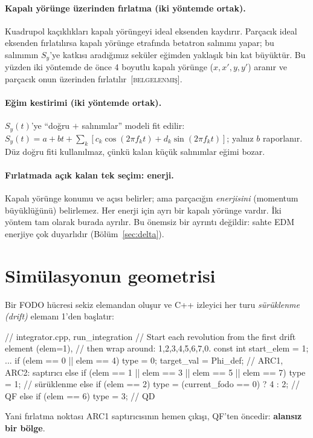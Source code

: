 \documentclass[11pt,a4paper]{article}
\newcommand{\BEL}{\textsc{[belgelenmiş]}}
\begin{document}
\paragraph{Kapalı yörünge üzerinden fırlatma (iki yöntemde ortak).} Kuadrupol kaçıklıkları kapalı
yörüngeyi ideal eksenden kaydırır. Parçacık ideal eksenden fırlatılırsa kapalı yörünge etrafında
betatron salınımı yapar; bu salınımın $S_y$'ye katkısı aradığımız seküler eğimden yaklaşık bin kat
büyüktür. Bu yüzden iki yöntemde de önce 4 boyutlu kapalı yörünge ($x,x',y,y'$) aranır ve parçacık onun
üzerinden fırlatılır~\BEL.

\paragraph{Eğim kestirimi (iki yöntemde ortak).} $S_y(t)$'ye ``doğru $+$ salınımlar'' modeli fit edilir:
$S_y(t)=a+bt+\sum_k[c_k\cos(2\pi f_kt)+d_k\sin(2\pi f_kt)]$; yalnız $b$ raporlanır. Düz doğru fiti
kullanılmaz, çünkü kalan küçük salınımlar eğimi bozar.

\paragraph{Fırlatmada açık kalan tek seçim: enerji.} Kapalı yörünge konumu ve açısı belirler; ama
parçacığın \emph{enerjisini} (momentum büyüklüğünü) belirlemez. Her enerji için ayrı bir kapalı yörünge
vardır. İki yöntem tam olarak burada ayrılır. Bu önemsiz bir ayrıntı değildir: sahte EDM enerjiye çok
duyarlıdır (Bölüm~\ref{sec:delta}).

\section{Simülasyonun geometrisi}

Bir FODO hücresi sekiz elemandan oluşur ve C++ izleyici her turu \emph{sürüklenme (drift)} elemanı 1'den
başlatır:
\begin{kodblok}
// integrator.cpp, run_integration
// Start each revolution from the first drift element (elem=1),
// then wrap around: 1,2,3,4,5,6,7,0.
const int start_elem = 1;
...
if (elem == 0 || elem == 4) { type = 0; target_val = Phi_def; }        // ARC1, ARC2: saptırıcı
else if (elem == 1 || elem == 3 || elem == 5 || elem == 7) { type = 1; }  // sürüklenme
else if (elem == 2) { type = (current_fodo == 0) ? 4 : 2; }               // QF
else if (elem == 6) { type = 3; }                                          // QD
\end{kodblok}
Yani fırlatma noktası ARC1 saptırıcısının hemen çıkışı, QF'ten öncedir: \textbf{alansız bir bölge}.
\end{document}
